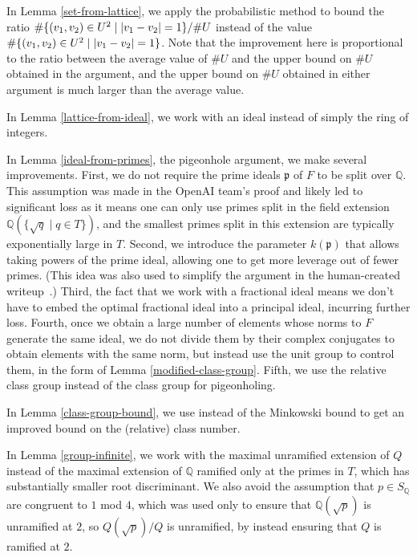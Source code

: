 \documentclass[12pt]{amsart}
\theoremstyle{remark}
\theoremstyle{definition}
\begin{document}
In Lemma \ref{set-from-lattice}, we apply the probabilistic method to bound the ratio $\# \{(v_1,v_2)\in U^2 \mid \abs{v_1-v_2}=1 \}/\#U$ instead of the value $\# \{(v_1,v_2)\in U^2 \mid \abs{v_1-v_2}=1 \}$.  Note that the improvement here is proportional to the ratio between the average value of $\#U$ and the upper bound on $\#U$ obtained in the argument, and the upper bound on $\#U$ obtained in either argument is much larger than the average value.

In Lemma \ref{lattice-from-ideal}, we work with an ideal instead of simply the ring of integers.

In Lemma \ref{ideal-from-primes}, the pigeonhole argument, we make several improvements. First, we do not require the prime ideals $\mathfrak p$ of $F$ to be split over $\mathbb Q$. This assumption was made in the OpenAI team's proof  and likely led to significant loss as it means one can only use primes split in the field extension $\mathbb Q(\{ \sqrt{q}\mid q \in T\})$, and the smallest primes split in this extension are typically exponentially large in $T$. Second, we introduce the parameter $k(\mathfrak p)$ that allows taking powers of the prime ideal, allowing one to get more leverage out of fewer primes. (This idea was also used to simplify the argument in the human-created writeup~\cite{humanwriteup}.) Third, the fact that we work with a fractional ideal means we don't have to embed the optimal fractional ideal into a principal ideal, incurring further loss. Fourth, once we obtain a large number of elements whose norms to $F$ generate the same ideal, we do not divide them by their complex conjugates to obtain elements with the same norm, but instead use the unit group to control them, in the form of Lemma \ref{modified-class-group}. Fifth, we use the relative class group instead of the class group for pigeonholing.

In Lemma \ref{class-group-bound}, we use \cite{Louboutin2000} instead of the Minkowski bound to get an improved bound on the (relative) class number. 

In Lemma \ref{group-infinite}, we work with the maximal unramified extension of $Q$ instead of the maximal extension of $\mathbb Q$ ramified only at the primes in $T$, which has substantially smaller root discriminant. We also avoid the assumption that $p\in S_\mathbb Q$ are congruent to $1$ mod $4$, which was used only to ensure that $\mathbb Q(\sqrt{p})$ is unramified at $2$, so $Q(\sqrt{p})/Q$ is unramified, by instead ensuring that $Q$ is ramified at $2$.
\end{document}
